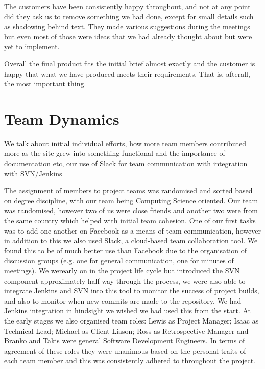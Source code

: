\documentclass{l3proj}
\begin{document}
The customers have been consistently happy throughout, and not at any point did they ask us to remove something we had done, except for small details such
as shadowing behind text. They made various suggestions during the meetings but even most of those were ideas that we had already thought about but were
yet to implement.

Overall the final product fits the initial brief almost exactly and the customer is happy that what we have produced meets their requirements. That
is, afterall, the most important thing.



\section{Team Dynamics}

We talk about initial individual efforts, how more team members contributed more as the site grew into something functional
and the importance of documentation etc, our use of Slack for team communication with integration with SVN/Jenkins

The assignment of members to project teams was randomised and sorted based on degree discipline, with our team being
Computing Science oriented. Our team was randomised, however two of us were close friends and another two were from the
same country which helped with initial team cohesion. One of our first tasks was to add one another on Facebook as a means of
team communication, however in addition to this we also used Slack, a cloud-based team collaboration tool. We found this to
be of much better use than Facebook due to the organisation of discussion groups (e.g. one for general communication, one for
minutes of meetings). We werearly on in the project life cycle
but introduced the SVN component approximately half way through the process, we were also able to integrate Jenkins and SVN into this tool to monitor the success of project builds,
and also to monitor when new commits are made to the repository. We had Jenkins integration in hindsight we wished we had used this from the
start. At the early stages we also organised team roles: Lewis as Project Manager; Isaac as Technical Lead; Michael as Client Liason;
Ross as Retrospective Manager and Branko and Takis were general Software Development Engineers. In terms of agreement of these roles they were unanimous
based on the personal traits of each team member and this was consistently adhered to throughout the project.
\end{document}
